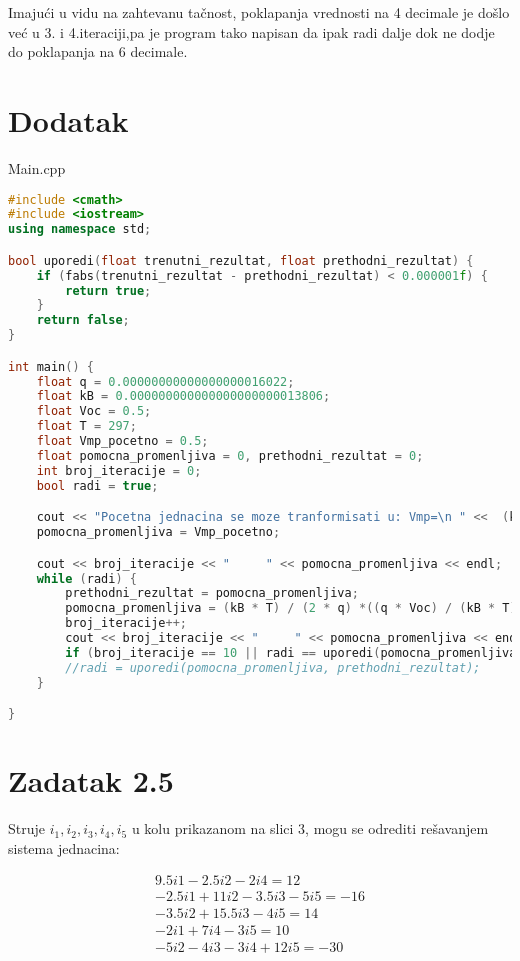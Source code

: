 \documentclass[12pt,leqno,a4paper]{article}
\begin{document}
Imaju\' ci u vidu na zahtevanu ta\v cnost, poklapanja vrednosti na 4 decimale je do\v slo ve\' c u 3. i 4.iteraciji,pa je program tako napisan da ipak radi dalje dok ne dodje do poklapanja  na 6 decimale.

\section{Dodatak}
Main.cpp
\begin{lstlisting}[language=C++ ]
#include <cmath>
#include <iostream>
using namespace std;

bool uporedi(float trenutni_rezultat, float prethodni_rezultat) {
	if (fabs(trenutni_rezultat - prethodni_rezultat) < 0.000001f) {
		return true;
	}
	return false;
}

int main() {
	float q = 0.00000000000000000016022;
	float kB = 0.000000000000000000000013806;
	float Voc = 0.5;
	float T = 297;
	float Vmp_pocetno = 0.5;
	float pomocna_promenljiva = 0, prethodni_rezultat = 0;
	int broj_iteracije = 0;
	bool radi = true;

	cout << "Pocetna jednacina se moze tranformisati u: Vmp=\n " <<  (kB * T)/(2*q) << " * ( " << (q * Voc) / (kB * T) << " - ln( " << q / (kB * T) << "*Vmp))" << endl << endl;
	pomocna_promenljiva = Vmp_pocetno;

	cout << broj_iteracije << "		" << pomocna_promenljiva << endl;
	while (radi) {
		prethodni_rezultat = pomocna_promenljiva;
		pomocna_promenljiva = (kB * T) / (2 * q) *((q * Voc) / (kB * T) - log((q * pomocna_promenljiva) / (kB * T)));
		broj_iteracije++;
		cout << broj_iteracije << "		" << pomocna_promenljiva << endl;
		if (broj_iteracije == 10 || radi == uporedi(pomocna_promenljiva, prethodni_rezultat)) { break; }
		//radi = uporedi(pomocna_promenljiva, prethodni_rezultat);
	}

}
\end{lstlisting}
\section*{Zadatak 2.5} 

Struje $i_1,i_2,i_3,i_4,i_5 $ u kolu prikazanom na slici 3, mogu se odrediti re\v savanjem sistema jednacina:

\begin{equation*}
  \begin{aligned}
    9.5i1-2.5i2-2i4=12 \\
    -2.5i1+11i2-3.5i3-5i5=-16\\
    -3.5i2+15.5i3-4i5=14\\
    -2i1+7i4-3i5=10\\
    -5i2-4i3-3i4+12i5=-30
 \end{aligned}
\end{equation*}
\end{document}
